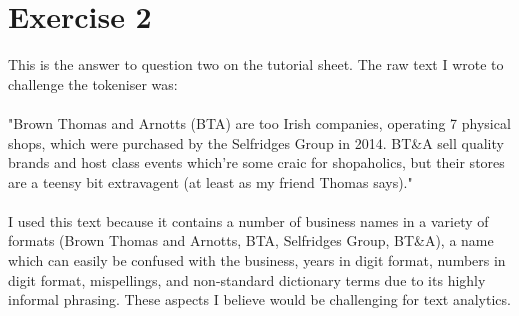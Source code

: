 \documentclass{scrreprt}
\begin{document}
\section{Exercise 2}
This is the answer to question two on the tutorial sheet. The raw text I wrote to challenge the tokeniser was:\\
\\
"Brown Thomas and Arnotts (BTA) are too Irish companies, operating 7 physical shops, which were purchased by the Selfridges Group in 2014. BT\&A sell quality brands and host class events which're some craic for shopaholics, but their stores are a teensy bit extravagent (at least as my friend Thomas says)."
\\
\\
I used this text because it contains a number of business names in a variety of formats (Brown Thomas and Arnotts, BTA, Selfridges Group, BT\&A), a name which can easily be confused with the business, years in digit format, numbers in digit format, mispellings, and non-standard dictionary terms due to its highly informal phrasing. These aspects I believe would be challenging for text analytics.
\end{document}
